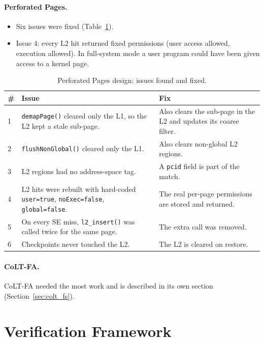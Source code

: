 \paragraph{Perforated Pages.}
\begin{itemize}
    \item Six issues were fixed (Table~\ref{tab:perf_bugs}).
    \item Issue 4: every L2 hit returned fixed permissions (user access allowed, execution allowed). In full-system mode a user program could have been given access to a kernel page.
\end{itemize}

\begin{table}[htbp]
\centering
\small
\caption{Perforated Pages design: issues found and fixed.}
\label{tab:perf_bugs}
\begin{tabularx}{\textwidth}{l X X}
\toprule
\textbf{\#} & \textbf{Issue} & \textbf{Fix} \\
\midrule
1 & \texttt{demapPage()} cleared only the L1, so the L2 kept a stale sub-page. & Also clears the sub-page in the L2 and updates its coarse filter. \\
2 & \texttt{flushNonGlobal()} cleared only the L1. & Also clears non-global L2 regions. \\
3 & L2 regions had no address-space tag. & A \texttt{pcid} field is part of the match. \\
4 & L2 hits were rebuilt with hard-coded \texttt{user=true}, \texttt{noExec=false}, \texttt{global=false}. & The real per-page permissions are stored and returned. \\
5 & On every SE miss, \texttt{l2\_insert()} was called twice for the same page. & The extra call was removed. \\
6 & Checkpoints never touched the L2. & The L2 is cleared on restore. \\
\bottomrule
\end{tabularx}
\end{table}

\paragraph{CoLT-FA.} CoLT-FA needed the most work and is described in its own section (Section~\ref{sec:colt_fs}).

\section{Verification Framework}
\label{sec:verif}

